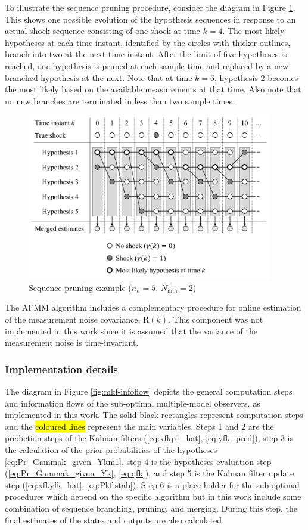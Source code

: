 {To illustrate the sequence pruning procedure, consider the diagram in Figure \ref{fig:mm-obs-seq-SP}. This shows one possible evolution of the hypothesis sequences in response to an actual shock sequence consisting of one shock at time $k=4$.  The most likely hypotheses at each time instant, identified by the circles with thicker outlines, branch into two at the next time instant. After the limit of five hypotheses is reached, one hypothesis is pruned at each sample time and replaced by a new branched hypothesis at the next. Note that at time $k=6$, hypothesis 2 becomes the most likely based on the available measurements at that time. Also note that no new branches are terminated in less than two sample times.
\begin{figure}[ht]
	\centering
	\includegraphics[width=10.7cm]{images/mm_obs_seq_SP.pdf}
	\caption{Sequence pruning example ($n_h=5$, $N_\text{min}=2$)}
	\label{fig:mm-obs-seq-SP}
\end{figure}

The \gls{AFMM} algorithm includes a complementary procedure for online estimation of the measurement noise covariance, $\mathrm{R}(k)$. This component was not implemented in this work since it is assumed that the variance of the measurement noise is time-invariant.

\subsubsection{Implementation details} \label{sec:implementation}

The diagram in Figure \ref{fig:mkf-infoflow} depicts the general computation steps and information flows of the sub-optimal multiple-model observers, as implemented in this work. The solid black rectangles represent computation steps and the \hl{coloured lines} represent the main variables. Steps 1 and 2 are the prediction steps of the Kalman filters (\ref{eq:xfkp1_hat}, \ref{eq:yfk_pred}), step 3 is the calculation of the prior probabilities of the hypotheses \eqref{eq:Pr_Gammak_given_Ykm1}, step 4 is the hypotheses evaluation step (\ref{eq:Pr_Gammak_given_Yk}, \ref{eq:qfk}), and step 5 is the Kalman filter update step (\ref{eq:xfkyfk_hat}, \ref{eq:Pkf-stab}). Step 6 is a place-holder for the sub-optimal procedures which depend on the specific algorithm but in this work include some combination of sequence branching, pruning, and merging. During this step, the final estimates of the states and outputs are also calculated.

}
